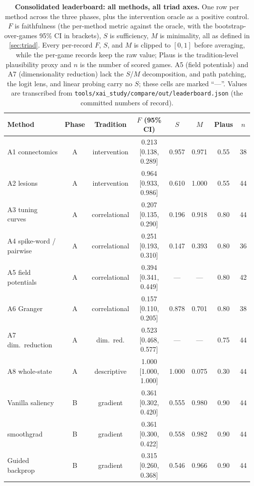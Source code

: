 \begin{table}[t]
\centering
\caption{\textbf{Consolidated leaderboard: all methods, all triad axes.} One row per method
across the three phases, plus the intervention oracle as a positive control. $F$ is
faithfulness (the per-method metric against the oracle, with the bootstrap-over-games 95\% CI in
brackets), $S$ is sufficiency, $M$ is minimality, all as defined in \Sectionname\ref{sec:triad}.
Every per-record $F$, $S$, and $M$ is clipped to $[0,1]$ before averaging, while the per-game records
keep the raw value;
Plaus is the tradition-level plausibility proxy and $n$ is the number of scored games. A5
(field potentials) and A7 (dimensionality reduction) lack the $S$/$M$ decomposition, and path
patching, the logit lens, and linear probing carry no $S$; these cells are marked ``---''.
Values are transcribed from \texttt{tools/xai\_study/compare/out/leaderboard.json} (the
committed numbers of record).}
\label{supp:leaderboard}
\footnotesize
\setlength{\tabcolsep}{4pt}
\begin{tabularx}{\textwidth}{@{}Xccccccc@{}}
\toprule
Method & Phase & Tradition & $F$ (95\% CI) & $S$ & $M$ & Plaus & $n$ \\
\midrule
A1 connectomics & A & intervention & 0.213 [0.138, 0.289] & 0.957 & 0.971 & 0.55 & 38 \\
A2 lesions & A & intervention & 0.964 [0.933, 0.986] & 0.610 & 1.000 & 0.55 & 44 \\
A3 tuning curves & A & correlational & 0.207 [0.135, 0.290] & 0.196 & 0.918 & 0.80 & 44 \\
A4 spike-word / pairwise & A & correlational & 0.251 [0.193, 0.310] & 0.147 & 0.393 & 0.80 & 36 \\
A5 field potentials & A & correlational & 0.394 [0.341, 0.449] & --- & --- & 0.80 & 42 \\
A6 Granger & A & correlational & 0.157 [0.110, 0.205] & 0.878 & 0.701 & 0.80 & 38 \\
A7 dim.\ reduction & A & dim.\ red. & 0.523 [0.468, 0.577] & --- & --- & 0.75 & 44 \\
A8 whole-state & A & descriptive & 1.000 [1.000, 1.000] & 1.000 & 0.075 & 0.30 & 44 \\
\midrule
Vanilla saliency & B & gradient & 0.361 [0.302, 0.420] & 0.555 & 0.980 & 0.90 & 44 \\
smoothgrad & B & gradient & 0.361 [0.300, 0.422] & 0.558 & 0.982 & 0.90 & 44 \\
Guided backprop & B & gradient & 0.315 [0.260, 0.368] & 0.546 & 0.966 & 0.90 & 44 \\

\end{tabularx}
\end{table}
